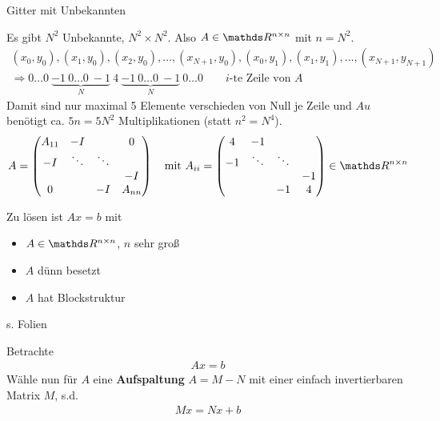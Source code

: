 \begin{Bspe}
\begin{image}{Gitter mit Unbekannten}
\end{image}
Es gibt $N^2$ Unbekannte, $N^2\times N^2$.
Also $A\in\R^{n\times n}$ mit $n=N^2$.
\begin{gather*}
  (x_0,y_0),(x_1,y_0),(x_2,y_0),
  \ldots,(x_{N+1},y_0),(x_0,y_1),(x_1,y_1),
  \ldots,(x_{N+1},y_{N+1})\\
  \Rightarrow 0\ldots0~\underbrace{-1~0\ldots0~-1}_{N}~4~
  \underbrace{-1~0\ldots0~-1}_{N}~0\ldots0
  \qquad \text{$i$-te Zeile von $A$}
\end{gather*}
Damit sind nur maximal 5 Elemente verschieden von Null je Zeile
und $Au$ benötigt ca. $5n=5N^2$ Multiplikationen (statt $n^2=N^4$).
\begin{gather}
  A=
  \begin{pmatrix}
    A_{11}&-I&&0\\
    -I &\ddots &\ddots \\
    && &-I\\
    0&&-I&A_{nn}    
  \end{pmatrix}
  \quad \text{mit }
  A_{ii}=\begin{pmatrix}
    4&-1\\
    -1&\ddots&\ddots\\
    &&&-1\\
    &&-1&4
  \end{pmatrix}\in\R^{n\times n}
\label{IX.1.2}
\end{gather}
\end{Bspe}

Zu lösen ist $Ax=b$ mit
\begin{itemize}
\item $A\in\R^{n\times n}$, $n$ sehr groß
\item $A$ dünn besetzt
\item $A$ hat Blockstruktur
\end{itemize}
s. Folien

Betrachte
\begin{gather}
  Ax=b
\label{IX.2.1}
\end{gather}
Wähle nun für $A$ eine \textbf{Aufspaltung} $A=M-N$
mit einer einfach invertierbaren Matrix $M$, s.d.
\begin{gather}
  Mx = Nx +b \label{IX.2.2}
\end{gather}

